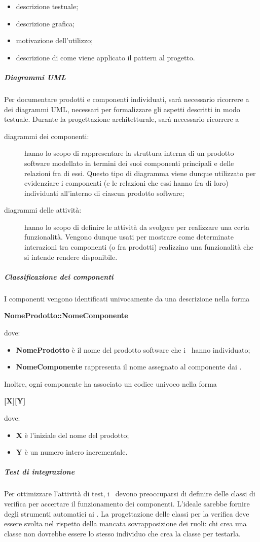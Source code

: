 \documentclass[../NormeProgetto.tex]{subfiles}
\begin{document}
				\begin{itemize}
					\item descrizione testuale;
					\item descrizione grafica;
					\item motivazione dell'utilizzo;
					\item descrizione di come viene applicato il pattern al progetto.
				\end{itemize}
			\subparagraph{Diagrammi UML}
				Per documentare prodotti e componenti individuati, sarà necessario ricorrere a dei diagrammi UML, necessari per formalizzare gli aspetti descritti in modo testuale. Durante la progettazione architetturale, sarà necessario ricorrere a 
				\begin{description}
					\item[diagrammi dei componenti:]  hanno lo scopo di rappresentare la struttura interna di un prodotto software modellato in termini dei suoi componenti principali e delle relazioni fra di essi. Questo tipo di diagramma viene dunque utilizzato per evidenziare i componenti (e le relazioni che essi hanno fra di loro) individuati all'interno di ciascun prodotto software;
					\item[diagrammi delle attività:]  hanno lo scopo di definire le attività da svolgere per realizzare una certa funzionalità. Vengono dunque usati per mostrare come determinate interazioni tra
componenti (o fra prodotti) realizzino una funzionalità che si intende rendere disponibile.
				\end{description}
			\subparagraph{Classificazione dei componenti}
				I componenti vengono identificati univocamente da una descrizione nella forma \begin{center}\textbf{NomeProdotto::NomeComponente}\end{center} dove:
				\begin{itemize}
					\item \textbf{NomeProdotto} è il nome del prodotto software che i \progettisti\ hanno individuato;
					\item \textbf{NomeComponente} rappresenta il nome assegnato al componente dai \progettisti.
				\end{itemize}
				Inoltre, ogni componente ha associato un codice univoco nella forma \begin{center}\textbf{[X][Y]}\end{center} dove:
				\begin{itemize}
					\item \textbf{X} è l'iniziale del nome del prodotto;
					\item \textbf{Y} è un numero intero incrementale.
				\end{itemize}
			\subparagraph{Test di integrazione}
				Per ottimizzare l'attività di test, i \progettisti\ devono preoccuparsi di definire delle classi di verifica per accertare il funzionamento dei componenti. L'ideale sarebbe fornire degli strumenti automatici ai \verificatori . La progettazione delle classi per la verifica deve essere svolta nel rispetto della mancata sovrapposizione dei ruoli: chi crea una classe non dovrebbe essere lo stesso individuo che crea la classe per testarla.
\end{document}

